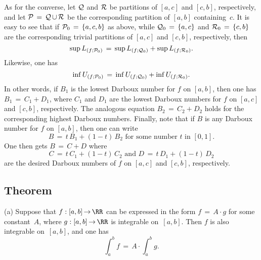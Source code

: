         As for the converse, let ${\cal Q}$ and ${\cal R}$ be partitions of $[a,c]$ and $[c,b]$, 
    respectively,
    and let ${\cal P} \,=\, {\cal Q}\,{\cup}\,{\cal R}$ be the corresponding partition of $[a,b]$ containing~$c$.
    It is easy to see that if ${\cal P}_{0} \,=\, \{a,c,b\}$ as above, while ${\cal Q}_{0} \,=\, \{a,c\}$ and ${\cal R}_{0} \,=\, \{c,b\}$ are the corresponding trivial partitions of $[a,c]$ and $[c,b]$, 
    respectively, then
        \begin{displaymath}
        {\sup}\,L_{(f;{\cal P}_{0})}
         \,=\, 
        {\sup}\,L_{(f;{\cal Q}_{0})}
    +
        {\sup}\,L_{(f;{\cal R}_{0})}.
        \end{displaymath}
    Likewise, one has
        \begin{displaymath}
        {\inf}\,U_{(f;{\cal P}_{0})}
         \,=\, 
        {\inf}\,U_{(f;{\cal Q}_{0})}
    +
        {\inf}\,U_{(f;{\cal R}_{0})}.
        \end{displaymath}
    In other words, if $B_{1}$ is the lowest Darboux number for $f$ on $[a,b]$, then one has
    $B_{1} \,=\, C_{1} + D_{1}$, where $C_{1}$ and $D_{1}$ are the lowest Darboux numbers for $f$ on $[a,c]$ and $[c,b]$, respectively.
    The analogous equation $B_{2} \,=\, C_{2} + D_{2}$ holds for the corresponding highest Darboux numbers.
    Finally, note that if $B$ is any Darboux number for $f$ on $[a,b]$, then one can write
        \begin{displaymath}
        B \,=\, t\,B_{1} + (1-t)\,B_{2} \mbox{ for some number $t$ in $[0,1]$}.
        \end{displaymath}
    One then gets $B \,=\, C+D$ where
        \begin{displaymath}
        C \,=\, t\,C_{1} + (1-t)\,C_{2}
    \mbox{ and }
        D \,=\, t\,D_{1} + (1-t)\,D_{2}
        \end{displaymath}
    are the desired Darboux numbers of $f$ on $[a,c]$ and $[c,b]$, respectively.

\VV

        \subsection{\small{{\bf Theorem}}}
        \label{ThmH25.20}

\V

\hspace*{\parindent}(a) Suppose that $f:[a,b] \,{\rightarrow}\, {\RR}$ can be expressed in the form $f \,=\, A{\cdot}g$ for some constant~$A$, where $g:[a,b] \,{\rightarrow}\, {\RR}$ is integrable on~$[a,b]$.
    Then $f$ is also integrable on~$[a,b]$, and one has
        \begin{displaymath}
        \int_{a}^{b} f \,=\, A{\cdot}\int_{a}^{b} g.
        \end{displaymath}
\V

